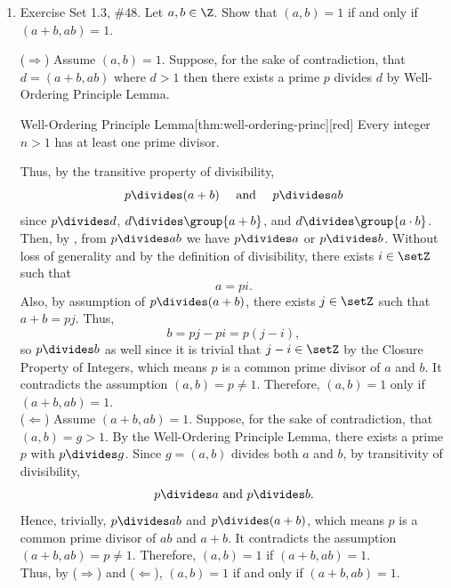 \begin{enumerate}
  \newpage

  \item Exercise Set 1.3, \#48. Let $a,b\in \Z$. Show that $(a,b)=1$ if and only if $(a+b,ab) = 1$.
  \begin{subprove}
    ($\Rightarrow$) Assume $(a, b)=1$. Suppose, for the sake of contradiction, that 
    $d=(a+b, a b)$ where $d>1$ then there exists a prime $p$ divides $d$ by Well-Ordering 
    Principle Lemma.
    \begin{define}{Well-Ordering Principle Lemma}[thm:well-ordering-princ][red]
    Every integer $n>1$ has at least one prime divisor.
    \end{define}
    Thus, by the transitive property of divisibility,
    $$
    p \divides(a+b) \quad \text { and } \quad p \divides a b
    $$
    since $p \divides d$, $d \divides \group{a+b}$, and $d \divides \group{a\cdot b}$.
    Then, by , from $p \divides ab$ we have $p \divides a$ or $p \divides b$.  
    Without loss of generality and by the definition of divisibility, there exists $i\in\setZ$ such that 
    $$
    a = p i.
    $$
    Also, by assumption of $p\divides(a+b)$, there exists $j\in\setZ$ such that $a+b = pj$. Thus,
    $$
    b = pj - pi = p(j-i),
    $$
    so $p\divides b$ as well since it is trivial that $j-i\in\setZ$ by the Closure Property of Integers, 
    which means $p$ is a common prime divisor of $a$ and $b$.
    It contradicts the assumption $(a,b) = p \ne 1$.
    Therefore, $(a,b)=1$ only if $(a+b,ab) = 1$.\vspace*{10px}\\
    ($\Leftarrow$) Assume $(a+b, a b)=1$. Suppose, for the sake of contradiction, 
    that $(a, b)=g>1$. By the Well-Ordering Principle Lemma, there exists a prime 
    $p$ with $p \divides g$. 
    Since $g=(a, b)$ divides both $a$ and $b$, by transitivity of divisibility,
    $$
    p\divides a \text { and } p \divides b .
    $$
    Hence, trivially, $p \divides a b$ and $p \divides(a+b)$, which means $p$ is a common 
    prime divisor of $a b$ and $a+b$. It contradicts the assumption $(a+b, a b) = p \ne1$.
    Therefore, $(a,b)=1$ if $(a+b,ab) = 1$.\vspace*{10px}\\
    Thus, by ($\Rightarrow$) and ($\Leftarrow$), $(a,b)=1$ if and only if $(a+b,ab) = 1$.
  \end{subprove}

  \newpage


\end{enumerate}
